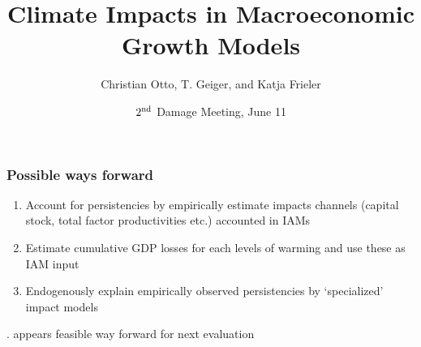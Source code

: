 \documentclass[
c,
11pt,
aspectratio=169, %
final,
]{beamer}
\author{Christian Otto, T. Geiger, and Katja Frieler}
\title{Climate Impacts in Macroeconomic Growth Models}
\date{$2^{\operatorname{nd}}$ Damage Meeting, June 11}
\begin{document}
\begin{frame}[plain]
  \maketitle
\end{frame}
\begin{frame}
  \frametitle{Possible ways forward}
  \begin{enumerate}
  \item Account for persistencies by empirically estimate impacts channels (capital stock, total factor productivities etc.) accounted in IAMs
  \item Estimate cumulative GDP losses for each levels of warming and use these as IAM input
  \item Endogenously explain empirically observed persistencies by `specialized' impact models 
  \end{enumerate}
  \begin{itemize}
. appears feasible way forward for next evaluation
  \end{itemize}
\end{frame}
\end{document}
